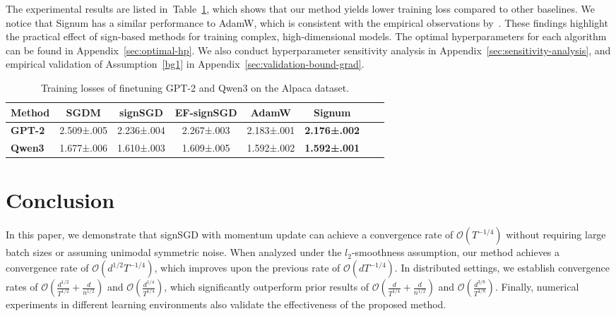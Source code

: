 \documentclass{article}
\begin{document}
The experimental results are listed in~Table~\ref{tab:llm}, which shows that our method yields lower training loss compared to other baselines. We notice that Signum has a similar performance to AdamW, which is consistent with the empirical observations by~\citet{kunstner2023noise,chen2023lion}. These findings highlight the practical effect of sign-based methods for training complex, high-dimensional models. The optimal hyperparameters for each algorithm can be found in Appendix~\ref{sec:optimal-hp}. We also conduct hyperparameter sensitivity analysis in Appendix~\ref{sec:sensitivity-analysis}, and empirical validation of Assumption~\ref{bg1} in Appendix~\ref{sec:validation-bound-grad}.



\begin{table}[t]
\centering
\caption{Training losses of finetuning GPT-2 and Qwen3 on the Alpaca dataset.\label{tab:llm}}

\begin{tabular}{lccccccc}
\toprule
\textbf{Method} & {SGDM} & {signSGD} & {EF-signSGD} & {AdamW}  & {Signum} \\
\midrule
\textbf{GPT-2} & 2.509±.005 & 2.236±.004 & 2.267±.003 & 2.183±.001 &  \textbf{2.176±.002} \\
\midrule
\textbf{Qwen3} & 1.677±.006 & 1.610±.003 & 1.609±.005 & 1.592±.002 &  \textbf{1.592±.001} \\
\bottomrule
\end{tabular}
\end{table}



\section{Conclusion}
In this paper, we demonstrate that signSGD with momentum update can achieve a convergence rate of $\mathcal{O}(T^{-1/4})$ without requiring large batch sizes or assuming unimodal symmetric noise. When analyzed under the $l_2$-smoothness assumption, our method achieves a convergence rate of $\mathcal{O}(d^{1/2} T^{-1/4})$, which improves upon the previous rate of $\mathcal{O}(d T^{-1/4})$.
In distributed settings, we establish convergence rates of $\mathcal{O}\left( \frac{d^{1/2}}{T^{1/2}} + \frac{d}{n^{1/2}} \right)$ and $\mathcal{O}\left( \frac{d^{1/4}}{T^{1/4}}\right)$, which significantly outperform prior results of $\mathcal{O}\left( \frac{d}{T^{1/4}} + \frac{d}{n^{1/2}} \right)$ and $\mathcal{O}\left( \frac{d^{3/8}}{T^{1/8}} \right)$. Finally, numerical experiments in different learning environments also validate the effectiveness of the proposed method.
\end{document}
